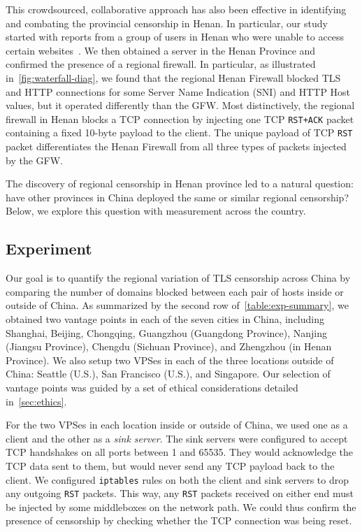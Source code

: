 \documentclass[conference,compsoc]{IEEEtran}
\begin{document}
This crowdsourced, collaborative approach has also been effective in identifying and combating the provincial censorship in Henan.
In particular,
our study started with reports from a group of users in Henan who were
unable to access certain websites~\cite{Henan-user-report, net4people442, net4people416, ghostcomment, tsinbei_tcp_timestamps}.
We then obtained a server in the Henan Province
and confirmed the presence of a regional firewall.
In particular,
as illustrated in~\autoref{fig:waterfall-diag},
we found that the regional Henan Firewall
blocked TLS and HTTP connections for some Server Name Indication (SNI) and HTTP Host values,
but it operated differently than the GFW.
Most distinctively,
the regional firewall in Henan blocks a TCP connection by injecting one TCP \texttt{RST+ACK} packet
containing a fixed 10-byte payload to the client.
The unique payload of TCP \texttt{RST} packet differentiates the Henan Firewall
from all three types of packets injected by the GFW.

The discovery of regional censorship in Henan province led to a natural question:
have other provinces in China deployed the same or similar regional censorship?
Below, we explore this question with measurement across the country.


\subsection{Experiment}

Our goal is to quantify the regional variation of TLS censorship across China
by comparing the number of domains blocked between each pair of hosts inside or outside of China.
%
As summarized by the second row of~\autoref{table:exp-summary},
we obtained two vantage points in each of the seven cities in China,
including Shanghai, Beijing, Chongqing,
Guangzhou (Guangdong Province),
Nanjing (Jiangsu Province),
Chengdu (Sichuan Province),
and Zhengzhou (in Henan Province).
We also setup two VPSes in each of the three locations outside of China:
Seattle (U.S.),
San Francisco (U.S.),
and Singapore.
Our selection of vantage points was
guided by a set of ethical considerations detailed in~\autoref{sec:ethics}.

For the two VPSes in each location inside or outside of China,
we used one as a client and the other as a \emph{sink server}.
The sink servers were configured to
accept TCP handshakes on all ports between 1 and 65535.
They would acknowledge the TCP data sent to them,
but would never send any TCP payload back to the client.
We configured \texttt{iptables} rules on both the client and sink servers to drop any outgoing \texttt{RST} packets.
This way,
any \texttt{RST} packets received on either end must be injected by some middleboxes on the network path.
We could thus confirm the presence of censorship by checking whether the TCP connection was being reset.
\end{document}
